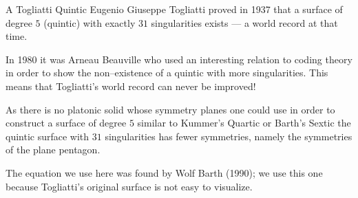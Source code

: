 \begin{surferPage}{A Togliatti Quintic}
    Eugenio Giuseppe Togliatti proved in 1937 that a surface of degree $5$ (quintic) with exactly $31$ singularities exists --- a world record at that time.


    In 1980 it was Arneau Beauville who used an interesting relation to coding
    theory in order to show the non--existence of a quintic with more
    singularities. 
    This means that Togliatti's world record can never be improved!

    As there is no platonic solid whose symmetry planes one could use in order
    to construct a surface of degree $5$ similar to Kummer's Quartic or
    Barth's Sextic the quintic surface with $31$ singularities has fewer symmetries,
    namely the symmetries of the plane pentagon.


 The equation we use here was found by Wolf Barth (1990); we use this one
    because Togliatti's original surface is not easy to visualize.
\end{surferPage}

